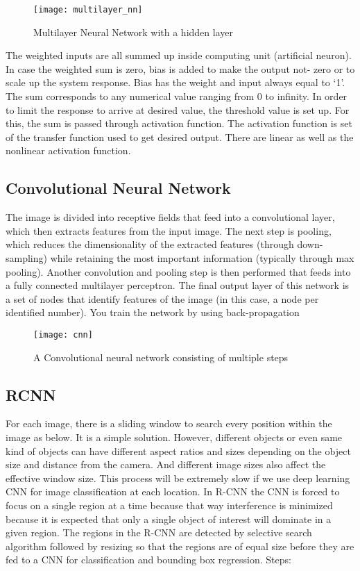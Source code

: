 	\begin{figure}[H]
		\centering
		\texttt{[image: multilayer\_nn]}
		\caption
		{Multilayer Neural Network with a hidden layer}
	\end{figure}

	The weighted inputs are all summed up inside computing unit (artificial neuron). In case the weighted sum is zero, bias is added to make the output not- zero or to scale up the system response. Bias has the weight and input always equal to ‘1’. The sum corresponds to any numerical value ranging from 0 to infinity. In order to limit the response to arrive at desired value, the threshold value is set up. For this, the sum is passed through activation function. The activation function is set of the transfer function used to get desired output. There are linear as well as the nonlinear activation function.

	\subsection{Convolutional Neural Network}

	The image is divided into receptive fields that feed into a convolutional layer, which then extracts features from the input image. The next step is pooling, which reduces the dimensionality of the extracted features (through down-sampling) while retaining the most important information (typically through max pooling).
	Another convolution and pooling step is then performed that feeds into a fully connected multilayer perceptron. The final output layer of this network is a set of nodes that identify features of the image (in this case, a node per identified number). You train the network by using back-propagation

	\begin{figure}
		\centering
		\texttt{[image: cnn]}
		\caption
		{A Convolutional neural network consisting of multiple steps}
	\end{figure}

	\subsection{RCNN}

	For each image, there is a sliding window to search every position within the image as below. It is a simple solution. However, different objects or even same kind of objects can have different aspect ratios and sizes depending on the object size and distance from the camera. And different image sizes also affect the effective window size. This process will be extremely slow if we use deep learning CNN for image classification at each location.
	In R-CNN the CNN is forced to focus on a single region at a time because that way interference is minimized because it is expected that only a single object of interest will dominate in a given region. The regions in the R-CNN are detected by selective search algorithm followed by resizing so that the regions are of equal size before they are fed to a CNN for classification and bounding box regression.
	Steps:


